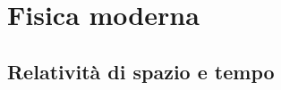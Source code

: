 \documentclass[a4paper,11pt,italian]{article}
\begin{document}
\begin{description}
%
% 
%   
%   
\end{description}


\newpage
\section{Fisica moderna}

\subsection{Relatività di spazio e tempo}
\end{document}
